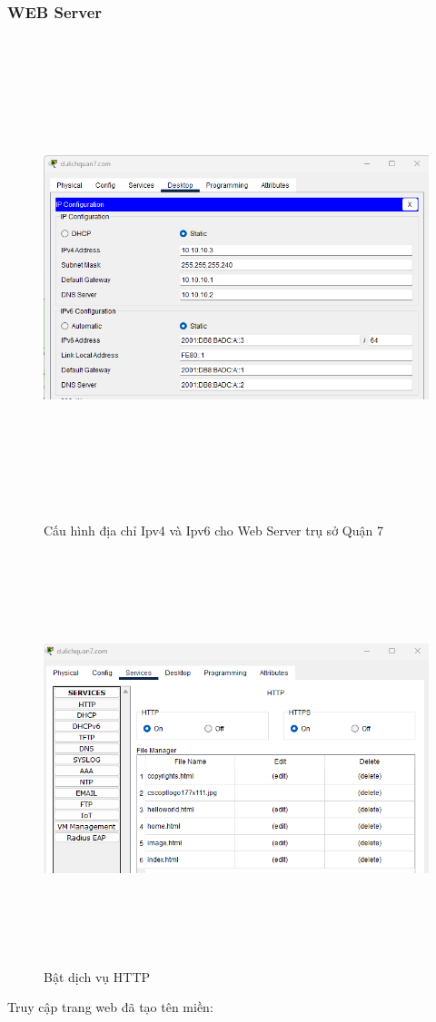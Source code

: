 \documentclass[a4paper, 12pt]{article}
\begin{document}
\subsubsection{WEB Server }
\begin{figure}[H]
    \centering
    \includegraphics[width=16cm, height=14cm]{img/4.2.1.png}
    \caption{Cấu hình địa chỉ Ipv4 và Ipv6 cho Web Server trụ sở Quận 7}
    \label{hinh421}
    
\end{figure}


\begin{figure}[H]
    \centering
    \includegraphics[width=17cm, height=12cm]{img/4.2.1b.png}
    \caption{ Bật dịch vụ HTTP}
    \label{hinh421b}
\end{figure}
Truy cập trang web đã tạo tên miền: \\
\end{document}
